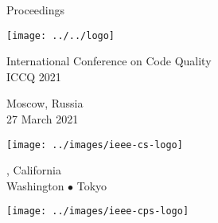 \thispagestyle{empty}
\begin{center}
Proceedings

\vspace{1in}

\texttt{[image: ../../logo]}

\vspace{0.5in}

{\Large International Conference on Code Quality\\[12pt]
ICCQ 2021}

\vspace{0.5in}

Moscow, Russia\\
27 March 2021

\vspace{2.5in}

\begin{multicols}{3}
\texttt{[image: ../images/ieee-cs-logo]}
\columnbreak

{\small {}, California\\
Washington $\bullet$ Tokyo}

\columnbreak
\texttt{[image: ../images/ieee-cps-logo]}
\end{multicols}
\end{center}
